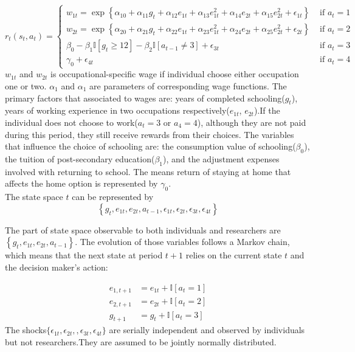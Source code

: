\begin{equation}
r_{t}\left(s_{t}, a_{t}\right)=\left\{\begin{array}{ll}
w_{1 t}=\exp \left\{\alpha_{10}+\alpha_{11} g_{t}+\alpha_{12} e_{1 t}+\alpha_{13} e_{1 t}^{2}+\alpha_{14} e_{2 t}+\alpha_{15} e_{2 t}^{2}+\epsilon_{1 t}\right\} & \text { if } a_{t}=1 \\
w_{2 t}=\exp \left\{\alpha_{20}+\alpha_{21} g_{t}+\alpha_{22} e_{1 t}+\alpha_{23} e_{1 t}^{2}+\alpha_{24} e_{2 t}+\alpha_{25} e_{2 t}^{2}+\epsilon_{2 t}\right\} & \text { if } a_{t}=2 \\
\beta_{0}-\beta_{1} \mathbb{I}\left[g_{t} \geq 12\right]-\beta_{2} \mathbb{I}\left[a_{t-1} \neq 3\right]+\epsilon_{3 t} & \text { if } a_{t}=3 \\
\gamma_{0}+\epsilon_{4 t} & \text { if } a_{t}=4
\end{array}\right.
\end{equation}
$w_{1t}$ and $w_{2t}$ is occupational-specific wage if individual choose either occupation one or two. $\alpha_1$ and $\alpha_1$ are parameters of corresponding wage functions. The primary factors that associated to wages are: years of completed schooling($g_t$), years of working experience in two occupations respectively($e_{1t}$, $e_{2t}$).If the individual does not choose to work($a_t=3$ or $a_4 = 4$), although they are not paid during this period, they still receive rewards from their choices. The variables that influence the choice of schooling are: the consumption value of schooling($\beta_0$), the tuition of post-secondary education($\beta_1$), and the adjustment expenses involved with returning to school. The means return of staying at home that affects the home option is represented by $\gamma_0$. \\

\noindent
The state space $t$ can be represented by
\begin{equation} \label{eq:2}
\left\{g_{t}, e_{1 t}, e_{2 t}, a_{t-1}, \epsilon_{1 t}, \epsilon_{2 t}, \epsilon_{3 t}, \epsilon_{4 t}\right\}
\end{equation}



\noindent
The part of state space observable to both individuals and researchers are $\left\{g_{t}, e_{1 t}, e_{2 t}, a_{t-1}\right\}$. The evolution of those variables follows a Markov chain, which means that the next state at period $t+1$ relies on the current state $t$ and the decision maker's action:


\begin{equation}\label{eq:3}
\begin{aligned}
e_{1, t+1} &=e_{1 t}+\mathbb{I}\left[a_{t}=1\right] \\
e_{2, t+1} &=e_{2 t}+\mathbb{I}\left[a_{t}=2\right] \\
g_{t+1} &=g_{t}+\mathbb{I}\left[a_{t}=3 \right]
\end{aligned}
\end{equation}
The shocks$\{\epsilon_{1t}, \epsilon_{2t},, \epsilon_{3t}, \epsilon_{4t}\}$ are serially independent and observed by individuals but not researchers.They are assumed to be jointly normally distributed. \\

